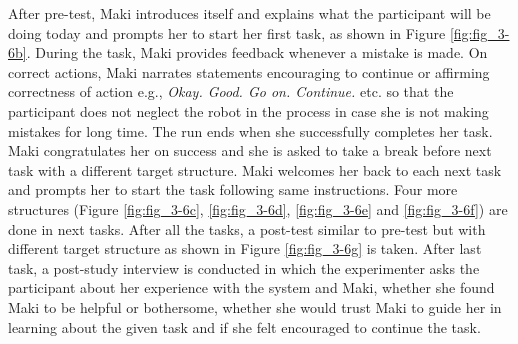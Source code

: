 After pre-test, Maki introduces itself and explains what the participant will be doing today and prompts her to start her first task, as shown in Figure \ref{fig:fig_3-6b}. During the task, Maki provides feedback whenever a mistake is made. On correct actions, Maki narrates statements encouraging to continue or affirming correctness of action e.g., \emph{Okay. Good. Go on. Continue.} etc. so that the participant does not neglect the robot in the process in case she is not making mistakes for long time. The run ends when she successfully completes her task. Maki congratulates her on success and she is asked to take a break before next task with a different target structure. Maki welcomes her back to each next task and prompts her to start the task following same instructions. Four more structures (Figure \ref{fig:fig_3-6c}, \ref{fig:fig_3-6d}, \ref{fig:fig_3-6e} and \ref{fig:fig_3-6f}) are done in next tasks. After all the tasks, a post-test similar to pre-test but with different target structure as shown in Figure \ref{fig:fig_3-6g} is taken. After last task, a post-study interview is conducted in which the experimenter asks the participant about her experience with the system and Maki, whether she found Maki to be helpful or bothersome, whether she would trust Maki to guide her in learning about the given task and if she felt encouraged to continue the task. 

